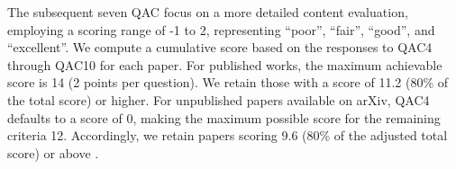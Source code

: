 The subsequent seven QAC focus on a more detailed content evaluation, employing a scoring range of -1 to 2, representing ``poor'', ``fair'', ``good'', and ``excellent''. 
We compute a cumulative score based on the responses to QAC4 through QAC10 for each paper. 
For published works, the maximum achievable score is 14 (2 points per question). We retain those with a score of 11.2 (80\% of the total score) or higher. 
For unpublished papers available on arXiv, QAC4 defaults to a score of 0, making the maximum possible score for the remaining criteria 12. Accordingly, we retain papers scoring 9.6 (80\% of the adjusted total score) or above .

